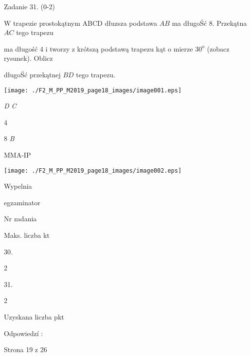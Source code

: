 \documentclass[a4paper,12pt]{article}
\begin{document}
Zadanie 31. (0-2)

$\mathrm{W}$ trapezie prostokątnym ABCD dłuzsza podstawa $AB$ ma długoŚć 8. Przekątna $AC$ tego trapezu

ma długość 4 i tworzy z krótszą podstawą trapezu kąt o mierze $30^{\mathrm{o}}$ (zobacz rysunek). Oblicz

długoŚć przekątnej $BD$ tego trapezu.
\begin{center}
\texttt{[image: ./F2\_M\_PP\_M2019\_page18\_images/image001.eps]}
\end{center}
{\it D  C}

4

8  {\it B}

MMA-IP
\begin{center}
\texttt{[image: ./F2\_M\_PP\_M2019\_page18\_images/image002.eps]}
\end{center}
Wypelnia

egzaminator

Nr zadania

Maks. liczba kt

30.

2

31.

2

Uzyskana liczba pkt

Odpowiedzí :

Strona 19 z 26
\end{document}
